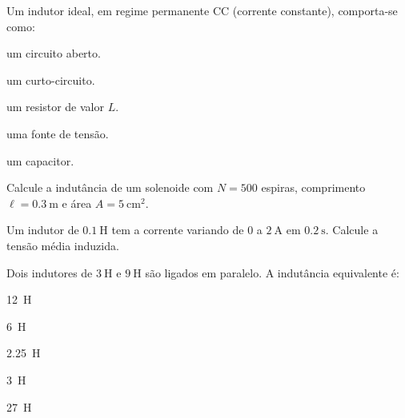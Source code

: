 \blocofixacao
\begin{questao}[1]{}

Um indutor ideal, em regime permanente CC (corrente constante), comporta-se como:
\begin{alternativas}
\item um circuito aberto.
\item um curto-circuito.
\item um resistor de valor $L$.
\item uma fonte de tensão.
\item um capacitor.
\end{alternativas}


\end{questao}
\begin{questao}[1]{}

Calcule a indutância de um solenoide com $N = 500$ espiras, comprimento
$\ell = \SI{0.3}{\meter}$ e área $A = \SI{5}{\centi\meter\squared}$.


\end{questao}
\begin{questao}[1]{}

Um indutor de $\SI{0.1}{\henry}$ tem a corrente variando de $0$ a
$\SI{2}{\ampere}$ em $\SI{0.2}{\second}$. Calcule a tensão média induzida.


\end{questao}
\begin{questao}[1]{}

Dois indutores de $\SI{3}{\henry}$ e $\SI{9}{\henry}$ são ligados em paralelo. A
indutância equivalente é:
\begin{alternativas}[3]
\item \SI{12}{\henry}
\item \SI{6}{\henry}
\item \SI{2.25}{\henry}
\item \SI{3}{\henry}
\item \SI{27}{\henry}
\end{alternativas}


\end{questao}

